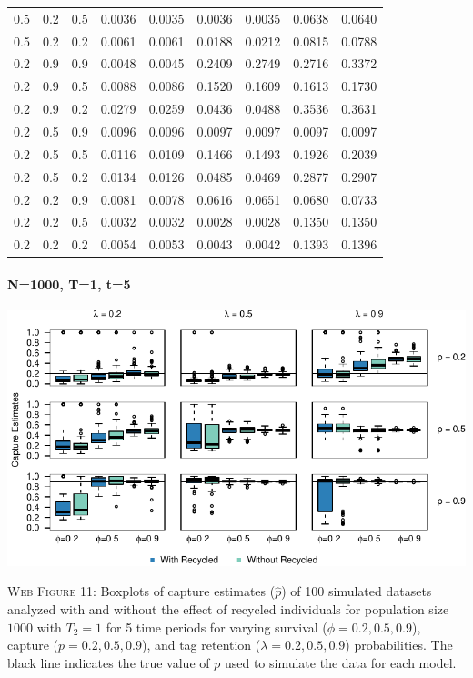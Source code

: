 \documentclass[]{article}
\let\oldparagraph\paragraph
\renewcommand{\paragraph}[1]{\oldparagraph{#1}\mbox{}}
\begin{document}
\begin{table}[ht]
{\begin{tabular}{rrrrrrrrr}
  0.5 & 0.2 & 0.5 & 0.0036 & 0.0035 & 0.0036 & 0.0035 & 0.0638 & 0.0640 \\ 
  0.5 & 0.2 & 0.2 & 0.0061 & 0.0061 & 0.0188 & 0.0212 & 0.0815 & 0.0788 \\ 
  0.2 & 0.9 & 0.9 & 0.0048 & 0.0045 & 0.2409 & 0.2749 & 0.2716 & 0.3372 \\ 
  0.2 & 0.9 & 0.5 & 0.0088 & 0.0086 & 0.1520 & 0.1609 & 0.1613 & 0.1730 \\ 
  0.2 & 0.9 & 0.2 & 0.0279 & 0.0259 & 0.0436 & 0.0488 & 0.3536 & 0.3631 \\ 
  0.2 & 0.5 & 0.9 & 0.0096 & 0.0096 & 0.0097 & 0.0097 & 0.0097 & 0.0097 \\ 
  0.2 & 0.5 & 0.5 & 0.0116 & 0.0109 & 0.1466 & 0.1493 & 0.1926 & 0.2039 \\ 
  0.2 & 0.5 & 0.2 & 0.0134 & 0.0126 & 0.0485 & 0.0469 & 0.2877 & 0.2907 \\ 
  0.2 & 0.2 & 0.9 & 0.0081 & 0.0078 & 0.0616 & 0.0651 & 0.0680 & 0.0733 \\ 
  0.2 & 0.2 & 0.5 & 0.0032 & 0.0032 & 0.0028 & 0.0028 & 0.1350 & 0.1350 \\ 
  0.2 & 0.2 & 0.2 & 0.0054 & 0.0053 & 0.0043 & 0.0042 & 0.1393 & 0.1396 \\ 
   \hline
\end{tabular}
}
\endgroup
\end{table}

\newpage

\paragraph{N=1000, T=1, t=5}\label{n1000-t1-t5-1}

\includegraphics{Appendix_files/figure-latex/figure11_capture_GJSTL5-1.pdf}

\textsc{Web Figure 11:} Boxplots of capture estimates (\(\hat{p}\)) of
100 simulated datasets analyzed with and without the effect of recycled
individuals for population size \(1000\) with \(T_2=1\) for 5 time
periods for varying survival (\(\phi=0.2,0.5,0.9\)), capture
(\(p=0.2,0.5,0.9\)), and tag retention (\(\lambda=0.2,0.5,0.9\))
probabilities. The black line indicates the true value of \(p\) used to
simulate the data for each model.
\end{document}
